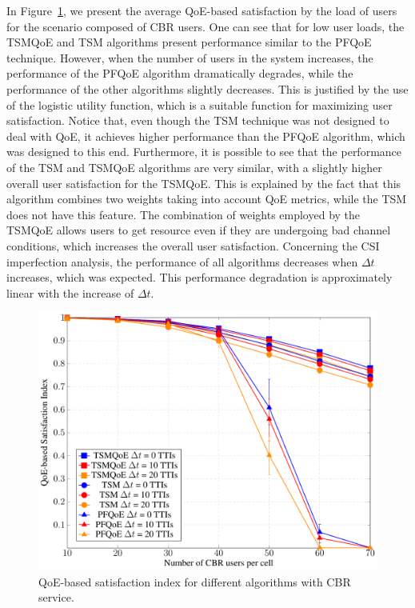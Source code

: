 \documentclass[12pt]{article}
\newcommand{\FigRef}[1]{Figure~\ref{#1}}
\begin{document}
In \FigRef{Fig:SatisfactionNRT}, we present the average QoE-based satisfaction by the load of users for the scenario composed of CBR users. One can see that for low user loads, the \ac{TSM}QoE and TSM algorithms present performance similar to the \ac{PF}QoE technique. However, when the number of users in the system increases, the performance of the \ac{PF}QoE algorithm dramatically degrades, while the performance of the other algorithms slightly decreases. This is justified by the use of the logistic utility function, which is a suitable function for maximizing user satisfaction. Notice that, even though the TSM technique was not designed to deal with QoE, it achieves higher performance than the PFQoE algorithm, which was designed to this end. Furthermore, it is possible to see that the performance of the TSM and TSMQoE algorithms are very similar, with a slightly higher overall user satisfaction for the TSMQoE. This is explained by the fact that this algorithm combines two weights taking into account QoE metrics, while the TSM does not have this feature. The combination of weights employed by the TSMQoE allows users to get resource even if they are undergoing bad channel conditions, which increases the overall user satisfaction. Concerning the CSI imperfection analysis, the performance of all algorithms decreases when $\Delta t$ increases, which was expected. This performance degradation is approximately linear with the increase of $\Delta t$. 

\begin{figure}[!t]
	\centering
	\includegraphics[width=0.55\linewidth,page=1]{figs_wp2/figs_BRUNO_PEDRO/NRT}
	\caption{QoE-based satisfaction index for different algorithms with \ac{CBR} service.}   
	\label{Fig:SatisfactionNRT}
\end{figure}
\end{document}
